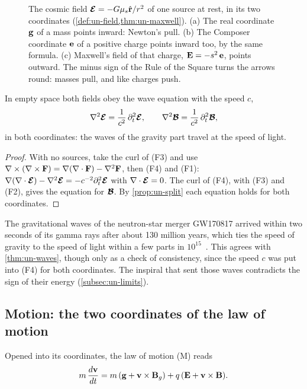 \begin{figure}[t]
\centering

\caption{The cosmic field $\boldsymbol{\mathcal{E}} = -G\mu_s\hat{\mathbf{r}}/r^2$ of one source at rest, in its two coordinates (\cref{def:un-field,thm:un-maxwell}). (a) The real coordinate $\mathbf{g}$ of a mass points inward: Newton's pull. (b) The Composer coordinate $\mathbf{e}$ of a positive charge points inward too, by the same formula. (c) Maxwell's field of that charge, $\mathbf{E} = -s^2\,\mathbf{e}$, points outward. The minus sign of the Rule of the Square turns the arrows round: masses pull, and like charges push.}
\label{fig:fields}
\end{figure}

\begin{theorem}\label{thm:un-waves}
In empty space both fields obey the wave equation with the speed $c$,
\[
\nabla^2\boldsymbol{\mathcal{E}} = \frac{1}{c^2}\,\partial_t^2\boldsymbol{\mathcal{E}} , \qquad \nabla^2\boldsymbol{\mathcal{B}} = \frac{1}{c^2}\,\partial_t^2\boldsymbol{\mathcal{B}} ,
\]
in both coordinates: the waves of the gravity part travel at the speed of light.
\end{theorem}

\begin{proof}
With no sources, take the curl of (F3) and use $\nabla\times(\nabla\times\mathbf{F}) = \nabla(\nabla\cdot\mathbf{F}) - \nabla^2\mathbf{F}$, then (F4) and (F1): $\nabla(\nabla\cdot\boldsymbol{\mathcal{E}}) - \nabla^2\boldsymbol{\mathcal{E}} = -c^{-2}\partial_t^2\boldsymbol{\mathcal{E}}$ with $\nabla\cdot\boldsymbol{\mathcal{E}} = 0$. The curl of (F4), with (F3) and (F2), gives the equation for $\boldsymbol{\mathcal{B}}$. By \cref{prop:un-split} each equation holds for both coordinates.
\end{proof}

The gravitational waves of the neutron-star merger GW170817 arrived within two seconds of its gamma rays after about 130 million years, which ties the speed of gravity to the speed of light within a few parts in $10^{15}$~\citep{Abbott2017GRB}. This agrees with \cref{thm:un-waves}, though only as a check of consistency, since the speed $c$ was put into (F4) for both coordinates. The inspiral that sent those waves contradicts the sign of their energy (\cref{subsec:un-limits}).

\subsection{Motion: the two coordinates of the law of motion}\label{subsec:un-motion}

\begin{proposition}\label{prop:un-lorentz}
Opened into its coordinates, the law of motion (M) reads
\[
m\,\frac{d\mathbf{v}}{dt} = m\,(\mathbf{g} + \mathbf{v}\times\mathbf{B}_g) + q\,(\mathbf{E} + \mathbf{v}\times\mathbf{B}) .
\]
\end{proposition}

